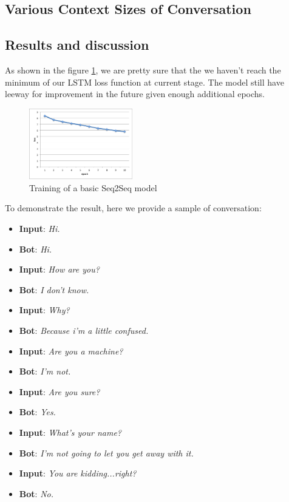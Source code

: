\subsection{Various Context Sizes of Conversation}


\subsection{Results and discussion}

As shown in the figure \ref{fig:loss}, we are pretty sure that the we haven't reach the minimum of our LSTM loss function at current stage. The model still have leeway for improvement in the future given enough additional epochs.

\begin{figure}[H]
\centering
\includegraphics[width=0.4\textwidth]{loss.png}
\caption{Training of a basic Seq2Seq model}
\label{fig:loss}
\end{figure}

To demonstrate the result, here we provide a sample of conversation:

\begin{itemize}
\item[~] \textbf{Input}: \textit{Hi.}
\item[~] \textbf{Bot}: \textit{Hi.}
\item[~] \textbf{Input}: \textit{How are you?}
\item[~] \textbf{Bot}: \textit{I don't know.}
\item[~] \textbf{Input}: \textit{Why?}
\item[~] \textbf{Bot}: \textit{Because i'm a little confused.}
\item[~] \textbf{Input}: \textit{Are you a machine?}
\item[~] \textbf{Bot}: \textit{I'm not.}
\item[~] \textbf{Input}: \textit{Are you sure?}
\item[~] \textbf{Bot}: \textit{Yes.}
\item[~] \textbf{Input}: \textit{What's your name?}
\item[~] \textbf{Bot}: \textit{I'm not going to let you get away with it.}
\item[~] \textbf{Input}: \textit{You are kidding...right?}
\item[~] \textbf{Bot}: \textit{No.}
\end{itemize}


